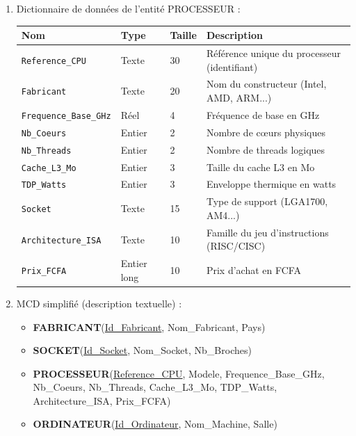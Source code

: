 \documentclass[11pt]{article}
\begin{document}
\begin{corrige}
\begin{enumerate}
    \item Dictionnaire de données de l'entité PROCESSEUR :
    \begin{center}
    \begin{tabularx}{\linewidth}{|l|l|l|X|}
    \hline
    \rowcolor{popblueL}
    \textbf{Nom} & \textbf{Type} & \textbf{Taille} & \textbf{Description} \\ \hline
    \texttt{Reference\_CPU} & Texte & 30 & Référence unique du processeur (identifiant) \\ \hline
    \texttt{Fabricant} & Texte & 20 & Nom du constructeur (Intel, AMD, ARM...) \\ \hline
    \texttt{Frequence\_Base\_GHz} & Réel & 4 & Fréquence de base en GHz \\ \hline
    \texttt{Nb\_Coeurs} & Entier & 2 & Nombre de cœurs physiques \\ \hline
    \texttt{Nb\_Threads} & Entier & 2 & Nombre de threads logiques \\ \hline
    \texttt{Cache\_L3\_Mo} & Entier & 3 & Taille du cache L3 en Mo \\ \hline
    \texttt{TDP\_Watts} & Entier & 3 & Enveloppe thermique en watts \\ \hline
    \texttt{Socket} & Texte & 15 & Type de support (LGA1700, AM4...) \\ \hline
    \texttt{Architecture\_ISA} & Texte & 10 & Famille du jeu d'instructions (RISC/CISC) \\ \hline
    \texttt{Prix\_FCFA} & Entier long & 10 & Prix d'achat en FCFA \\ \hline
    \end{tabularx}
    \end{center}
    \item MCD simplifié (description textuelle) :
    \begin{itemize}
        \item \textbf{FABRICANT}(\underline{Id\_Fabricant}, Nom\_Fabricant, Pays)
        \item \textbf{SOCKET}(\underline{Id\_Socket}, Nom\_Socket, Nb\_Broches)
        \item \textbf{PROCESSEUR}(\underline{Reference\_CPU}, Modele, Frequence\_Base\_GHz, Nb\_Coeurs, Nb\_Threads, Cache\_L3\_Mo, TDP\_Watts, Architecture\_ISA, Prix\_FCFA)
        \item \textbf{ORDINATEUR}(\underline{Id\_Ordinateur}, Nom\_Machine, Salle)

\end{itemize}
\end{enumerate}
\end{corrige}
\end{document}

